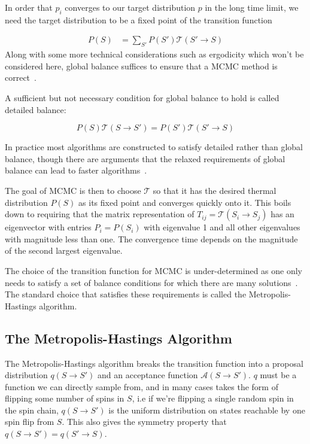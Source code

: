 In order that \(p_i\) converges to our target distribution \(p\) in the long time limit, we need the target distribution to be a fixed point of the transition function

\[\begin{aligned}
P(S) &= \sum_{S'} P(S') \mathcal{T}(S' \rightarrow S)
\end{aligned}
\] Along with some more technical considerations such as ergodicity which won't be considered here, global balance suffices to ensure that a MCMC method is correct~\autocite{kellyReversibilityStochasticNetworks1981}.

A sufficient but not necessary condition for global balance to hold is called detailed balance:

\[
P(S) \mathcal{T}(S \rightarrow S') = P(S') \mathcal{T}(S' \rightarrow S)
\]

In practice most algorithms are constructed to satisfy detailed rather than global balance, though there are arguments that the relaxed requirements of global balance can lead to faster algorithms~\autocite{kapferSamplingPolytopeHarddisk2013}.

The goal of MCMC is then to choose \(\mathcal{T}\) so that it has the desired thermal distribution \(P(S)\) as its fixed point and converges quickly onto it. This boils down to requiring that the matrix representation of \(T_{ij} = \mathcal{T}(S_i \to S_j)\) has an eigenvector with entries \(P_i = P(S_i)\) with eigenvalue 1 and all other eigenvalues with magnitude less than one. The convergence time depends on the magnitude of the second largest eigenvalue.

The choice of the transition function for MCMC is under-determined as one only needs to satisfy a set of balance conditions for which there are many solutions~\autocite{kellyReversibilityStochasticNetworks1981}. The standard choice that satisfies these requirements is called the Metropolis-Hastings algorithm.

\hypertarget{the-metropolis-hastings-algorithm}{%
\subsection{The Metropolis-Hastings Algorithm}\label{the-metropolis-hastings-algorithm}}

The Metropolis-Hastings algorithm breaks the transition function into a proposal distribution \(q(S \to S')\) and an acceptance function \(\mathcal{A}(S \to S')\). \(q\) must be a function we can directly sample from, and in many cases takes the form of flipping some number of spins in \(S\), i.e if we're flipping a single random spin in the spin chain, \(q(S \to S')\) is the uniform distribution on states reachable by one spin flip from \(S\). This also gives the symmetry property that \(q(S \to S') = q(S' \to S)\).


